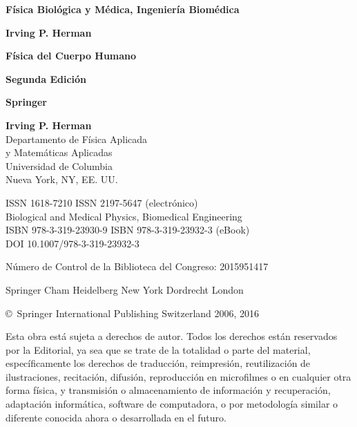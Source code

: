 ﻿\documentclass{book}
\begin{document}
\thispagestyle{empty}
\begin{center}
    \vspace*{3cm}
    {\large\textbf{Física Biológica y Médica, Ingeniería Biomédica}}
    
    \vspace{2.5cm}
    {\Huge\textbf{Irving P. Herman}}
    
    \vspace{1.5cm}
    {\Huge\textbf{Física del Cuerpo Humano}}
    
    \vspace{1.2cm}
    {\Large\textbf{Segunda Edición}}
    
    \vspace*{\fill}
    {\large\textbf{Springer}}
\end{center}
\clearpage

\thispagestyle{empty}
\noindent\textbf{Irving P. Herman} \\
Departamento de Física Aplicada \\
y Matemáticas Aplicadas \\
Universidad de Columbia \\
Nueva York, NY, EE. UU.

\vspace{3em}
\noindent ISSN 1618-7210 \hfill ISSN 2197-5647 (electrónico) \\
Biological and Medical Physics, Biomedical Engineering \\
ISBN 978-3-319-23930-9 \hfill ISBN 978-3-319-23932-3 (eBook) \\
DOI 10.1007/978-3-319-23932-3

\vspace{1.5em}
\noindent Número de Control de la Biblioteca del Congreso: 2015951417

\vspace{1.5em}
\noindent Springer Cham Heidelberg New York Dordrecht London

\vspace{1.5em}
\noindent \copyright\ Springer International Publishing Switzerland 2006, 2016

\vspace{1.5em}
\noindent Esta obra está sujeta a derechos de autor. Todos los derechos están reservados por la Editorial, ya sea que se trate de la totalidad o parte del material, específicamente los derechos de traducción, reimpresión, reutilización de ilustraciones, recitación, difusión, reproducción en microfilmes o en cualquier otra forma física, y transmisión o almacenamiento de información y recuperación, adaptación informática, software de computadora, o por metodología similar o diferente conocida ahora o desarrollada en el futuro.
\end{document}
